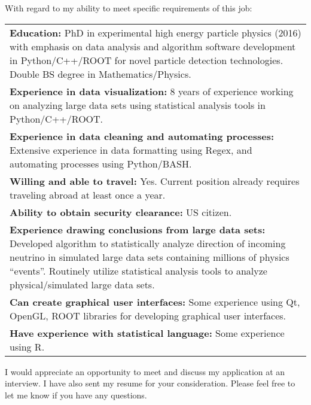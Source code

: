 \documentclass[11pt,letterpaper,sans]{moderncv}        %
\begin{document}
With regard to my ability to meet specific requirements of this job:
\noindent\begin{tabularx}{\linewidth}{@{{}\textbullet\enskip}X@{\quad}@{}}
	\textbf{Education:} PhD in experimental high energy particle physics (2016)
	with emphasis on data analysis and algorithm software development in
	Python/C++/ROOT for novel particle detection technologies. Double BS degree
	in Mathematics/Physics.\\
	\textbf{Experience in data visualization:} 8 years of experience working on
	analyzing large data sets using statistical analysis tools in
	Python/C++/ROOT.\\
	\textbf{Experience in data cleaning and automating processes:} Extensive
	experience in data formatting using Regex, and automating processes using
	Python/BASH.\\
	\textbf{Willing and able to travel:} Yes. Current position already requires
	traveling abroad at least once a year.\\
	\textbf{Ability to obtain security clearance:} US citizen.\\
	\textbf{Experience drawing conclusions from large data sets:} Developed
	algorithm to statistically analyze direction of incoming neutrino in
	simulated large data sets containing millions of physics ``events''.
	Routinely utilize statistical analysis tools to analyze physical/simulated
	large data sets.\\
	\textbf{Can create graphical user interfaces:} Some experience using Qt,
	OpenGL, ROOT libraries for developing graphical user interfaces.\\
	\textbf{Have experience with statistical language:} Some experience using R.\\
\end{tabularx}


I would appreciate an opportunity to meet and discuss my application at an
interview. I have also sent my resume for your consideration. Please feel free
to let me know if you have any questions.

\makeletterclosing
\end{document}
